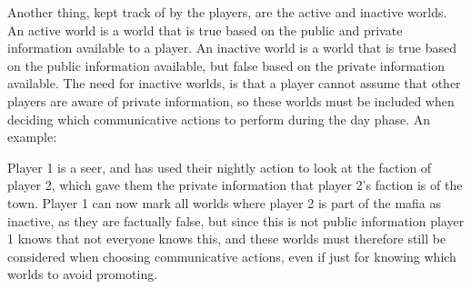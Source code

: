 Another thing, kept track of by the players, are the active and inactive
worlds. An active world is a world that is true based on the public and private
information available to a player. An inactive world is a world that is true
based on the public information available, but false based on the private
information available. The need for inactive worlds, is that a player cannot
assume that other players are aware of private information, so these worlds
must be included when deciding which communicative actions to perform during
the day phase. An example:

Player 1 is a seer, and has used their nightly action to look at the faction of
player 2, which gave them the private information that player 2's faction is of
the town. Player 1 can now mark all worlds where player 2 is part of the mafia
as inactive, as they are factually false, but since this is not public
information player 1 knows that not everyone knows this, and these worlds must
therefore still be considered when choosing communicative actions, even if just
for knowing which worlds to avoid promoting.
